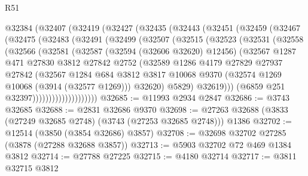 \begin{lexlean}{R51}
\begin{coremodule}
    @32384
      (@32407
        (@32419
          (@32427
            (@32435
              (@32443
                (@32451
                  (@32459
                    (@32467
                      (@32475
                        (@32483
                          (@32491
                            (@32499
                              (@32507
                                (@32515
                                  (@32523
                                    (@32531
                                      (@32558
                                        (@32566
                                          (@32581
                                            (@32587
                                              (@32594 (@32606 @32620) @12456)
                                              (@32567
                                                @1287
                                                @471
                                                @27830
                                                @3812
                                                @27842
                                                @2752
                                                (@32589
                                                  @1286
                                                  @4179
                                                  @27829
                                                  @27937
                                                  @27842
                                                  (@32567
                                                    @1284
                                                    @684
                                                    @3812
                                                    @3817
                                                    @10068
                                                    @9370
                                                    (@32574 @1269 @10068 (@3914 (@32577 @1269)))
                                                    @32620)
                                                  @5829)
                                                @32619)))
                                          (@6859 @251 @32397))))))))))))))))))))
@32685 := @11993 @2934 @2847
@32686 := @3743 @32685
@32688 := @2831 @32686 @9370
@32698 := @27263 @32688 (@3833 (@27249 @32685 @2748) (@3743 (@27253 @32685 @2748))) @1386
@32702 := @12514 (@3850 (@3854 @32686) @3857)
@32708 := @32698 @32702 @27285 (@3878 (@27288 @32688 @3857))
@32713 := @5903 @32702 @72 @469 @1384 @3812
@32714 := @27788 @27225
@32715 := @4180 @32714
@32717 := @3811 @32715 @3812

\end{coremodule}
\end{lexlean}
